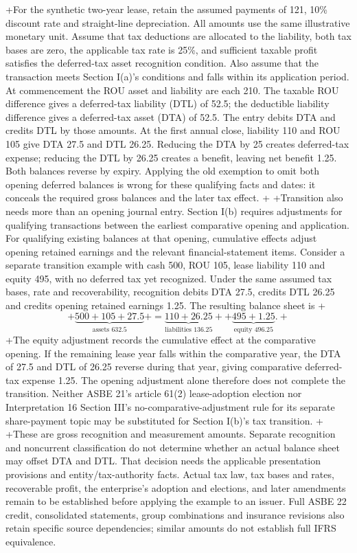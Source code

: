 +For the synthetic two-year lease, retain the assumed payments of 121, 10\% discount rate and straight-line depreciation. All amounts use the same illustrative monetary unit. Assume that tax deductions are allocated to the liability, both tax bases are zero, the applicable tax rate is 25\%, and sufficient taxable profit satisfies the deferred-tax asset recognition condition. Also assume that the transaction meets Section I(a)'s conditions and falls within its application period. At commencement the ROU asset and liability are each 210. The taxable ROU difference gives a deferred-tax liability (DTL) of 52.5; the deductible liability difference gives a deferred-tax asset (DTA) of 52.5. The entry debits DTA and credits DTL by those amounts. At the first annual close, liability 110 and ROU 105 give DTA 27.5 and DTL 26.25. Reducing the DTA by 25 creates deferred-tax expense; reducing the DTL by 26.25 creates a benefit, leaving net benefit 1.25. Both balances reverse by expiry. Applying the old exemption to omit both opening deferred balances is wrong for these qualifying facts and dates: it conceals the required gross balances and the later tax effect.
+
+Transition also needs more than an opening journal entry. Section I(b) requires adjustments for qualifying transactions between the earliest comparative opening and application. For qualifying existing balances at that opening, cumulative effects adjust opening retained earnings and the relevant financial-statement items. Consider a separate transition example with cash 500, ROU 105, lease liability 110 and equity 495, with no deferred tax yet recognized. Under the same assumed tax bases, rate and recoverability, recognition debits DTA 27.5, credits DTL 26.25 and credits opening retained earnings 1.25. The resulting balance sheet is
+\[
+\underbrace{500+105+27.5}_{\text{assets }632.5}
+=\underbrace{110+26.25}_{\text{liabilities }136.25}
++\underbrace{495+1.25}_{\text{equity }496.25}.
+\]
+The equity adjustment records the cumulative effect at the comparative opening. If the remaining lease year falls within the comparative year, the DTA of 27.5 and DTL of 26.25 reverse during that year, giving comparative deferred-tax expense 1.25. The opening adjustment alone therefore does not complete the transition. Neither ASBE 21's article 61(2) lease-adoption election nor Interpretation 16 Section III's no-comparative-adjustment rule for its separate share-payment topic may be substituted for Section I(b)'s tax transition.
+
+These are gross recognition and measurement amounts. Separate recognition and noncurrent classification do not determine whether an actual balance sheet may offset DTA and DTL. That decision needs the applicable presentation provisions and entity/tax-authority facts. Actual tax law, tax bases and rates, recoverable profit, the enterprise's adoption and elections, and later amendments remain to be established before applying the example to an issuer. Full ASBE 22 credit, consolidated statements, group combinations and insurance revisions also retain specific source dependencies; similar amounts do not establish full IFRS equivalence.
